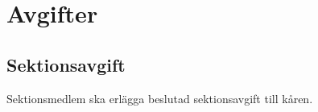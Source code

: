\section{Avgifter}
\subsection{Sektionsavgift}
Sektionsmedlem ska erlägga beslutad sektionsavgift till kåren.
